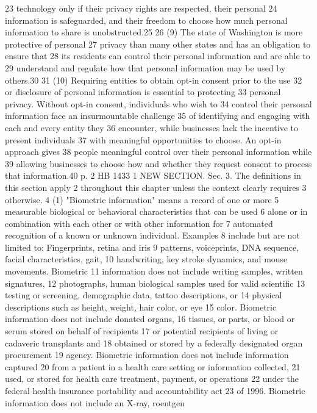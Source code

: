 23 technology only if their privacy rights are respected, their personal
24 information is safeguarded, and their freedom to choose how much
personal information to share is unobstructed.25
26 (9) The state of Washington is more protective of personal
27 privacy than many other states and has an obligation to ensure that
28 its residents can control their personal information and are able to
29 understand and regulate how that personal information may be used by
others.30
31 (10) Requiring entities to obtain opt-in consent prior to the use
32 or disclosure of personal information is essential to protecting
33 personal privacy. Without opt-in consent, individuals who wish to
34 control their personal information face an insurmountable challenge
35 of identifying and engaging with each and every entity they
36 encounter, while businesses lack the incentive to present individuals
37 with meaningful opportunities to choose. An opt-in approach gives
38 people meaningful control over their personal information while
39 allowing businesses to choose how and whether they request consent to
process that information.40
p. 2 HB 1433
1 NEW SECTION. Sec. 3. The definitions in this section apply
2 throughout this chapter unless the context clearly requires
3 otherwise.
4 (1) "Biometric information" means a record of one or more
5 measurable biological or behavioral characteristics that can be used
6 alone or in combination with each other or with other information for
7 automated recognition of a known or unknown individual. Examples
8 include but are not limited to: Fingerprints, retina and iris
9 patterns, voiceprints, DNA sequence, facial characteristics, gait,
10 handwriting, key stroke dynamics, and mouse movements. Biometric
11 information does not include writing samples, written signatures,
12 photographs, human biological samples used for valid scientific
13 testing or screening, demographic data, tattoo descriptions, or
14 physical descriptions such as height, weight, hair color, or eye
15 color. Biometric information does not include donated organs,
16 tissues, or parts, or blood or serum stored on behalf of recipients
17 or potential recipients of living or cadaveric transplants and
18 obtained or stored by a federally designated organ procurement
19 agency. Biometric information does not include information captured
20 from a patient in a health care setting or information collected,
21 used, or stored for health care treatment, payment, or operations
22 under the federal health insurance portability and accountability act
23 of 1996. Biometric information does not include an X-ray, roentgen
